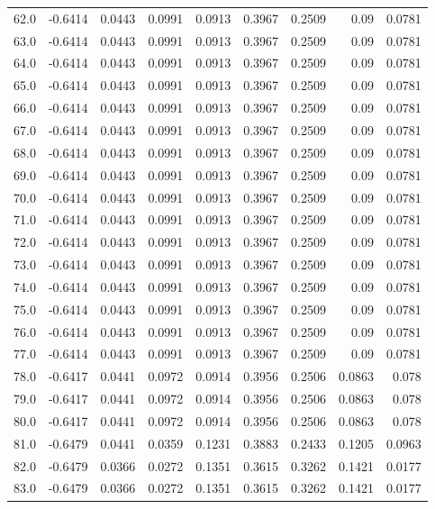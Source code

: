 \begin{longtable}{lrrrrrrrr}
62.0 & -0.6414 & 0.0443 & 0.0991 & 0.0913 & 0.3967 & 0.2509 & 0.09 & 0.0781 \\
63.0 & -0.6414 & 0.0443 & 0.0991 & 0.0913 & 0.3967 & 0.2509 & 0.09 & 0.0781 \\
64.0 & -0.6414 & 0.0443 & 0.0991 & 0.0913 & 0.3967 & 0.2509 & 0.09 & 0.0781 \\
65.0 & -0.6414 & 0.0443 & 0.0991 & 0.0913 & 0.3967 & 0.2509 & 0.09 & 0.0781 \\
66.0 & -0.6414 & 0.0443 & 0.0991 & 0.0913 & 0.3967 & 0.2509 & 0.09 & 0.0781 \\
67.0 & -0.6414 & 0.0443 & 0.0991 & 0.0913 & 0.3967 & 0.2509 & 0.09 & 0.0781 \\
68.0 & -0.6414 & 0.0443 & 0.0991 & 0.0913 & 0.3967 & 0.2509 & 0.09 & 0.0781 \\
69.0 & -0.6414 & 0.0443 & 0.0991 & 0.0913 & 0.3967 & 0.2509 & 0.09 & 0.0781 \\
70.0 & -0.6414 & 0.0443 & 0.0991 & 0.0913 & 0.3967 & 0.2509 & 0.09 & 0.0781 \\
71.0 & -0.6414 & 0.0443 & 0.0991 & 0.0913 & 0.3967 & 0.2509 & 0.09 & 0.0781 \\
72.0 & -0.6414 & 0.0443 & 0.0991 & 0.0913 & 0.3967 & 0.2509 & 0.09 & 0.0781 \\
73.0 & -0.6414 & 0.0443 & 0.0991 & 0.0913 & 0.3967 & 0.2509 & 0.09 & 0.0781 \\
74.0 & -0.6414 & 0.0443 & 0.0991 & 0.0913 & 0.3967 & 0.2509 & 0.09 & 0.0781 \\
75.0 & -0.6414 & 0.0443 & 0.0991 & 0.0913 & 0.3967 & 0.2509 & 0.09 & 0.0781 \\
76.0 & -0.6414 & 0.0443 & 0.0991 & 0.0913 & 0.3967 & 0.2509 & 0.09 & 0.0781 \\
77.0 & -0.6414 & 0.0443 & 0.0991 & 0.0913 & 0.3967 & 0.2509 & 0.09 & 0.0781 \\
78.0 & -0.6417 & 0.0441 & 0.0972 & 0.0914 & 0.3956 & 0.2506 & 0.0863 & 0.078 \\
79.0 & -0.6417 & 0.0441 & 0.0972 & 0.0914 & 0.3956 & 0.2506 & 0.0863 & 0.078 \\
80.0 & -0.6417 & 0.0441 & 0.0972 & 0.0914 & 0.3956 & 0.2506 & 0.0863 & 0.078 \\
81.0 & -0.6479 & 0.0441 & 0.0359 & 0.1231 & 0.3883 & 0.2433 & 0.1205 & 0.0963 \\
82.0 & -0.6479 & 0.0366 & 0.0272 & 0.1351 & 0.3615 & 0.3262 & 0.1421 & 0.0177 \\
83.0 & -0.6479 & 0.0366 & 0.0272 & 0.1351 & 0.3615 & 0.3262 & 0.1421 & 0.0177 \\

\end{longtable}
